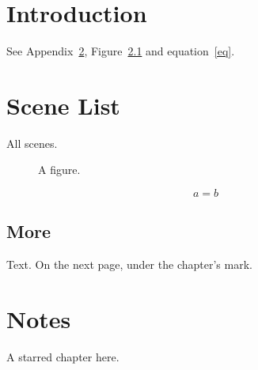 \documentclass{report}
\begin{document}
\tableofcontents
\listoffigures
\chapter{Introduction}
See Appendix~\ref{scenes}, Figure~\ref{fig} and equation~\ref{eq}.
\appendix
\chapter{Scene List}\label{scenes}
All scenes.
\begin{figure}[h]\centering\caption{A figure.}\label{fig}\end{figure}
\begin{equation}\label{eq} a = b \end{equation}
\section{More}
Text.
\vspace*{600pt}
On the next page, under the chapter's mark.
\chapter*{Notes}
A starred chapter here.
\end{document}
